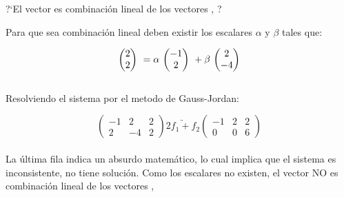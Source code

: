 
\begin{ejemplo}
?`El vector  es combinación lineal de los vectores 
, ?
\end{ejemplo}


Para que sea combinación lineal deben existir los escalares
$\alpha$ y $\beta$ tales que:

\[\mbox{ \ensuremath{\begin{pmatrix} 2\\ 2\\ \end{pmatrix} } }=\alpha\mbox{ \ensuremath{\begin{pmatrix} -1\\ 2\\ \end{pmatrix} } }+
\beta\mbox{ \ensuremath{\begin{pmatrix} 2\\ -4\\ \end{pmatrix} } }\]
~\\
Resolviendo el sistema por el metodo de Gauss-Jordan:

\[
\left(
\begin{array}{rr|r}
-1 & 2 & 2\\
2&-4&2
\end{array}
\right)
\underrightarrow{2f_1 + f_2}
\left(
\begin{array}{rr|r}
-1 & 2 & 2\\
0&0&6
\end{array}
\right)
\]
~\\
La última fila indica un absurdo matem\'atico, lo cual implica que el sistema es inconsistente, no
tiene solución. Como los escalares no existen, el vector  NO es combinación lineal de los vectores 
, 

\newpage
%
%
%
%
%
%
%
%

